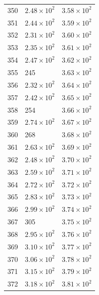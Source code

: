 \begin{table}[H]
\begin{tabular}{lll}
350 & $\displaystyle 2.48 \times 10^{2}$ & $\displaystyle 3.58 \times 10^{2}$ \\
351 & $\displaystyle 2.44 \times 10^{2}$ & $\displaystyle 3.59 \times 10^{2}$ \\
352 & $\displaystyle 2.31 \times 10^{2}$ & $\displaystyle 3.60 \times 10^{2}$ \\
353 & $\displaystyle 2.35 \times 10^{2}$ & $\displaystyle 3.61 \times 10^{2}$ \\
354 & $\displaystyle 2.47 \times 10^{2}$ & $\displaystyle 3.62 \times 10^{2}$ \\
355 & 245 & $\displaystyle 3.63 \times 10^{2}$ \\
356 & $\displaystyle 2.32 \times 10^{2}$ & $\displaystyle 3.64 \times 10^{2}$ \\
357 & $\displaystyle 2.42 \times 10^{2}$ & $\displaystyle 3.65 \times 10^{2}$ \\
358 & 254 & $\displaystyle 3.66 \times 10^{2}$ \\
359 & $\displaystyle 2.74 \times 10^{2}$ & $\displaystyle 3.67 \times 10^{2}$ \\
360 & 268 & $\displaystyle 3.68 \times 10^{2}$ \\
361 & $\displaystyle 2.63 \times 10^{2}$ & $\displaystyle 3.69 \times 10^{2}$ \\
362 & $\displaystyle 2.48 \times 10^{2}$ & $\displaystyle 3.70 \times 10^{2}$ \\
363 & $\displaystyle 2.59 \times 10^{2}$ & $\displaystyle 3.71 \times 10^{2}$ \\
364 & $\displaystyle 2.72 \times 10^{2}$ & $\displaystyle 3.72 \times 10^{2}$ \\
365 & $\displaystyle 2.83 \times 10^{2}$ & $\displaystyle 3.73 \times 10^{2}$ \\
366 & $\displaystyle 2.99 \times 10^{2}$ & $\displaystyle 3.74 \times 10^{2}$ \\
367 & 305 & $\displaystyle 3.75 \times 10^{2}$ \\
368 & $\displaystyle 2.95 \times 10^{2}$ & $\displaystyle 3.76 \times 10^{2}$ \\
369 & $\displaystyle 3.10 \times 10^{2}$ & $\displaystyle 3.77 \times 10^{2}$ \\
370 & $\displaystyle 3.06 \times 10^{2}$ & $\displaystyle 3.78 \times 10^{2}$ \\
371 & $\displaystyle 3.15 \times 10^{2}$ & $\displaystyle 3.79 \times 10^{2}$ \\
372 & $\displaystyle 3.18 \times 10^{2}$ & $\displaystyle 3.81 \times 10^{2}$ \\

\end{tabular}
\end{table}
